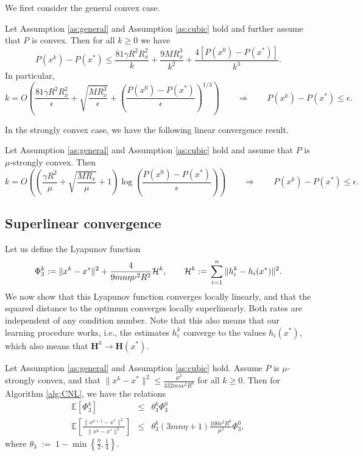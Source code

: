 \documentclass[12pt]{article}
\newcommand{\eqdef}{\; { := }\;}
\newcommand{\newalpha}{h}
\newcommand{\mH}{\mathbf{H}}
\begin{document}
We first consider the general convex case. 

\begin{theorem}\label{th:concubic}
	Let Assumption \ref{as:general} and Assumption \ref{as:cubic} hold and further assume that $P$ is convex. Then for all $k\geq 0$ we have 
	\[
	P(x^k) - P(x^*) 
	\leq \frac{81\gamma R^2 R_x^2}{k} + \frac{9MR_x^3}{k^2} + \frac{4[P(x^0) - P(x^*)]}{k^3}.
	\]  In particular,  
	$$
	k = O\left( \frac{81\gamma R^2 R_x^2}{\epsilon}  + \sqrt{\frac{MR_x^3}{\epsilon}} + \left(  \frac{P(x^0) - P(x^*)}{\epsilon}  \right)^{1/3}   \right) \qquad \Rightarrow \qquad P(x^k) - P(x^*) \leq \epsilon.
	$$
\end{theorem}


In the strongly convex case, we have the following linear convergence result. 

\begin{theorem}\label{th:stronglyconcubic}
	Let Assumption \ref{as:general} and Assumption \ref{as:cubic} hold and assume that $P$ is $\mu$-strongly convex. Then 	$$
	k = O\left( \left(  \frac{\gamma R^2}{\mu} + \sqrt{\frac{MR_x}{\mu}} + 1 \right) \log \left(  \frac{P(x^0) - P(x^*)}{\epsilon}  \right)   \right) \qquad \Rightarrow \qquad P(x^k) - P(x^*) \leq \epsilon.
	$$
\end{theorem}






\subsection{Superlinear convergence}


Let us define the Lyapunov function 
$$
\Phi_3^k \eqdef \|x^{k} - x^*\|^2 + \frac{4}{9mn\eta  \nu^2 R^2} {\cal H}^{k}, \qquad {\cal H}^k \eqdef  \sum_{i=1}^n \|h_i^k - \newalpha_i(x^*)\|^2.
$$
We now show that this Lyapunov function converges locally linearly, and that the squared distance to the optimum converges locally superlinearly. Both rates are independent of any condition number. Note that this also means that our learning procedure works, i.e., the estimates $h_i^k$ converge to the values $\newalpha_i(x^*)$, which also means that $\mH^k \to \mH(x^*)$. 

\begin{theorem}\label{th:cubicsup}
	Let Assumption \ref{as:general} and Assumption \ref{as:cubic} hold. Assume $P$ is $\mu$-strongly convex, and that $\|x^k - x^*\|^2 \leq \frac{\mu^2}{432m n \nu^2R^6}$ for all $k\geq 0$. Then for Algorithm \ref{alg:CNL}, we have the relations
\begin{eqnarray*}
	\mathbb{E} \left[\Phi_3^k \right] & \leq &  \theta_3^k \Phi_3^0 \\
		\mathbb{E} \left[  \frac{\|x^{k+1} - x^*\|^2}{\|x^k - x^*\|^2 }  \right]	&	\leq & \theta_3^k  \left(  {3m n\eta} + 1  \right) \frac{100\nu^2 R^6}{\mu^2} \Phi_3^0, 
	\end{eqnarray*}
	where $\theta_3 \eqdef  1 - \min \left\{  \frac{\eta}{2}, \frac{1}{4}  \right\}$.
\end{theorem}
\end{document}

